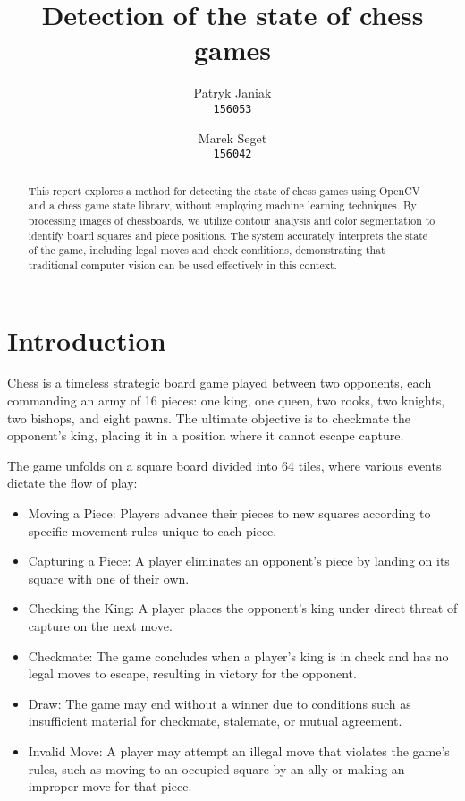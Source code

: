 \documentclass{article}
\title{Detection of the state of chess games}
\author{
  Patryk Janiak\\
  \texttt{156053}
  \and
  Marek Seget\\
  \texttt{156042}
}
\begin{document}
\maketitle

\begin{abstract}
This report explores a method for detecting the state of chess games using OpenCV and a chess game state library, without employing machine learning techniques. By processing images of chessboards, we utilize contour analysis and color segmentation to identify board squares and piece positions. The system accurately interprets the state of the game, including legal moves and check conditions, demonstrating that traditional computer vision can be used effectively in this context.
\end{abstract}

\section{Introduction}
Chess is a timeless strategic board game played between two opponents, each commanding an army of 16 pieces: one king, one queen, two rooks, two knights, two bishops, and eight pawns. The ultimate objective is to checkmate the opponent's king, placing it in a position where it cannot escape capture.

The game unfolds on a square board divided into 64 tiles, where various events dictate the flow of play:
\begin{itemize}
\item Moving a Piece: Players advance their pieces to new squares according to specific movement rules unique to each piece.
\item Capturing a Piece: A player eliminates an opponent's piece by landing on its square with one of their own.
\item Checking the King: A player places the opponent's king under direct threat of capture on the next move.
\item Checkmate: The game concludes when a player's king is in check and has no legal moves to escape, resulting in victory for the opponent.
\item Draw: The game may end without a winner due to conditions such as insufficient material for checkmate, stalemate, or mutual agreement.
\item Invalid Move: A player may attempt an illegal move that violates the game's rules, such as moving to an occupied square by an ally or making an improper move for that piece.
\end{itemize}
\end{document}
